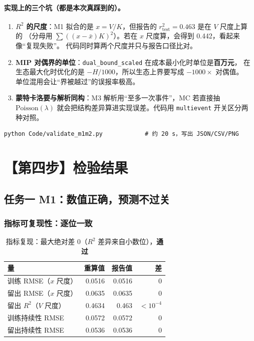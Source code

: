 \documentclass[11pt,a4paper]{ctexart}
\newcommand{\ok}{\textcolor{okc}{\textbf{通过}}}
\begin{document}
\paragraph{实现上的三个坑（都是本次真踩到的）。}
\begin{enumerate}
\item \textbf{$R^2$ 的尺度}：M1 拟合的是 $x=V/K$，但报告的 $r^2_{\text{test}}=0.463$ 是在 $V$ 尺度上算的
      （分母用 $\sum((x-\bar x)K)^2$）。若在 $x$ 尺度算，会得到 0.442，看起来像“复现失败”。
      代码同时算两个尺度并只与报告口径比对。
\item \textbf{MIP 对偶界的单位}：\texttt{dual\_bound\_scaled} 在成本最小化时单位是\textbf{百万元}，
      在生态最大化时优化的是 $-H/1000$，所以生态上界要写成 $-1000\times$ 对偶值。
      单位混用会让“界被越过”的误报率极高。
\item \textbf{蒙特卡洛要与解析同构}：M3 解析用“至多一次事件”，MC 若直接抽 $\mathrm{Poisson}(\lambda)$
      就会把结构差异算进实现误差。代码用 \texttt{multievent} 开关区分两种对照。
\end{enumerate}

\begin{verbatim}
python Code/validate_m1m2.py            # 约 20 s，写出 JSON/CSV/PNG
\end{verbatim}

\section{【第四步】检验结果}

\subsection{任务一 M1：数值正确，预测不过关}

\subsubsection{指标可复现性：逐位一致}

\begin{table}[htbp]\centering\small
\begin{tabular}{lrrr}
\toprule
量 & 重算值 & 报告值 & 差 \\
\midrule
训练 RMSE（$x$ 尺度） & 0.0516 & 0.0516 & $0$ \\
留出 RMSE（$x$ 尺度） & 0.0635 & 0.0635 & $0$ \\
留出 $R^2$（$V$ 尺度） & 0.4634 & 0.463 & $<10^{-4}$ \\
训练持续性 RMSE & 0.0572 & 0.0572 & $0$ \\
留出持续性 RMSE & 0.0536 & 0.0536 & $0$ \\
\bottomrule
\end{tabular}
\caption{指标复现：最大绝对差 $0$（$R^2$ 差异来自小数位），\ok}\label{tab:m1metrics}
\end{table}
\end{document}

